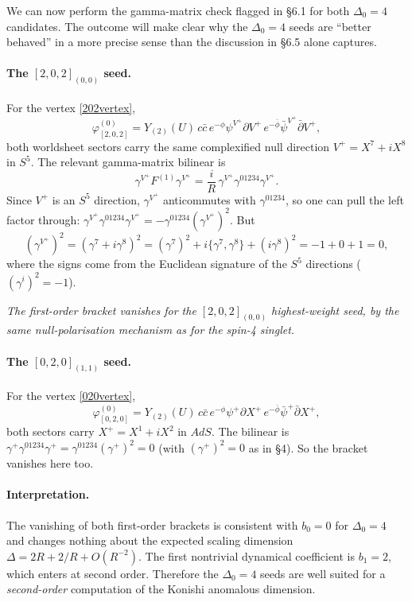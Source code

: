\documentclass[12pt]{article}
\def\be{\begin{equation}}
\def\ee{\end{equation}}
\newcommand{\D}{\ensuremath{\Delta}}
\begin{document}
We can now perform the gamma-matrix check flagged in \S6.1 for both $\D_0=4$ candidates.
The outcome will make clear why the $\D_0=4$ seeds are ``better behaved'' in a more precise sense
than the discussion in \S6.5 alone captures.

\paragraph{The $[2,0,2]_{(0,0)}$ seed.}
For the vertex \eqref{202vertex},
\be
\varphi^{(0)}_{[2,0,2]}
=Y_{(2)}(U)\, c\bar c\,
e^{-\phi}\psi^{V^+}\partial V^+\,
e^{-\bar\phi}\bar\psi^{V^+}\bar\partial V^+,
\ee
both worldsheet sectors carry the same complexified null direction $V^+=X^7+iX^8$ in $S^5$.
The relevant gamma-matrix bilinear is
\be
\gamma^{V^+}F^{(1)}\gamma^{V^+}
=\frac{i}{R}\,\gamma^{V^+}\gamma^{01234}\gamma^{V^+}.
\ee
Since $V^+$ is an $S^5$ direction, $\gamma^{V^+}$ anticommutes with $\gamma^{01234}$,
so one can pull the left factor through:
$\gamma^{V^+}\gamma^{01234}\gamma^{V^+}=-\gamma^{01234}(\gamma^{V^+})^2$.
But
\be
(\gamma^{V^+})^2=(\gamma^7+i\gamma^8)^2
=(\gamma^7)^2+i\{\gamma^7,\gamma^8\}+(i\gamma^8)^2
=-1+0+1=0,
\ee
where the signs come from the Euclidean signature of the $S^5$ directions ($(\gamma^i)^2=-1$).

\emph{The first-order bracket vanishes for the $[2,0,2]_{(0,0)}$ highest-weight seed,
by the same null-polarisation mechanism as for the spin-4 singlet.}

\paragraph{The $[0,2,0]_{(1,1)}$ seed.}
For the vertex \eqref{020vertex},
\be
\varphi^{(0)}_{[0,2,0]}
=Y_{(2)}(U)\, c\bar c\,
e^{-\phi}\psi^+\partial X^+\,
e^{-\bar\phi}\bar\psi^+\bar\partial X^+,
\ee
both sectors carry $X^+=X^1+iX^2$ in $AdS$.
The bilinear is $\gamma^+\gamma^{01234}\gamma^+=\gamma^{01234}(\gamma^+)^2=0$
(with $(\gamma^+)^2=0$ as in \S4). So the bracket vanishes here too.

\paragraph{Interpretation.}
The vanishing of both first-order brackets is consistent with $b_0=0$ for $\D_0=4$
and changes nothing about the expected scaling dimension
$\D=2R+2/R+O(R^{-2})$.
The first nontrivial dynamical coefficient is $b_1=2$, which enters at second order.
Therefore the $\D_0=4$ seeds are well suited for a \emph{second-order} computation
of the Konishi anomalous dimension.
\end{document}
